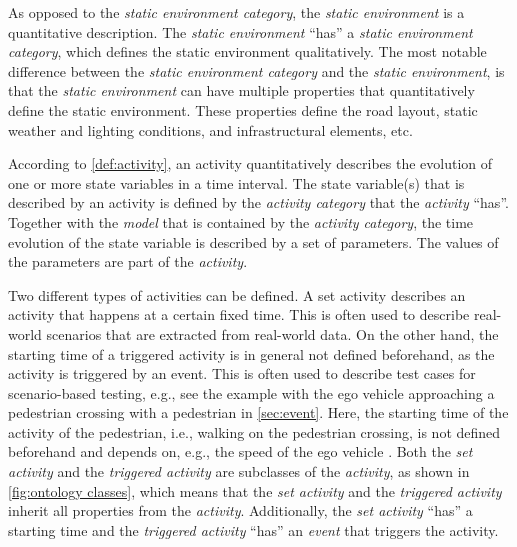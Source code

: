As opposed to the \textit{static environment category}, the \textit{static environment} is a quantitative description.
The \textit{static environment} ``has'' a \textit{static environment category}, which defines the static environment qualitatively. The most notable difference between the \textit{static environment category} and the \textit{static environment}, is that the \textit{static environment} can have multiple properties that quantitatively define the static environment. These properties define the road layout, static weather and lighting conditions, and infrastructural elements, etc.


According to \cref{def:activity}, an activity quantitatively describes the evolution of \cstart one or more state variables \cend in a time interval. The state \cstart variable(s) \cend that is described by an activity is defined by the \textit{activity category} that the \textit{activity} ``has''. Together with the \textit{model} that is contained by the \textit{activity category}, the time evolution of the state \cstart variable \cend is described by a set of parameters. The values of the parameters are part of the \textit{activity}. 


Two different types of activities can be defined. A set activity describes an activity that happens at a certain fixed time. This is often used to describe real-world scenarios that are extracted from real-world data. On the other hand, the starting time of a triggered activity is in general not defined beforehand, as the activity is triggered by an event. This is often used to describe test cases for scenario-based testing, e.g., see the example with the ego vehicle approaching a pedestrian crossing with a pedestrian in \cref{sec:event}. Here, the starting time of the activity of the pedestrian, i.e., walking on the pedestrian crossing, is not defined beforehand and depends on, e.g., the speed of the ego vehicle \autocite{seiniger2015test}. Both the \textit{set activity} and the \textit{triggered activity} are subclasses of the \textit{activity}, as shown in \cref{fig:ontology classes}, which means that the \textit{set activity} and the \textit{triggered activity} inherit all properties from the \textit{activity}. Additionally, the \textit{set activity} ``has'' a starting time and the \textit{triggered activity} ``has'' an \textit{event} that triggers the activity.


